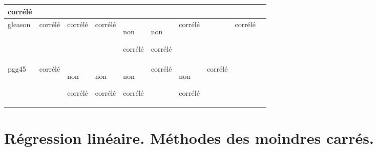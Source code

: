 \documentclass[a4paper, 12pt]{article}
\begin{document}
\begin{enumerate}
\begin{tabular}{|p{1.4cm}|p{1.4cm}|p{1.4cm}|p{1.4cm}|p{1.4cm}|p{1.4cm}|p{1.4cm}|p{1.4cm}|p{1.4cm}|p{1.4cm}|}
    corrélé \\
    \hline
    gleason & corrélé & corrélé & corrélé & non 

    corrélé & non 

    corrélé & corrélé & & corrélé \\
    \hline
    pgg45 & corrélé & non 

    corrélé & non 

    corrélé & non 

    corrélé & corrélé & non 

    corrélé & corrélé & \\
    \hline

\end{tabular}

\end{enumerate}



\section{Régression linéaire. Méthodes des moindres carrés.}
\end{document}

